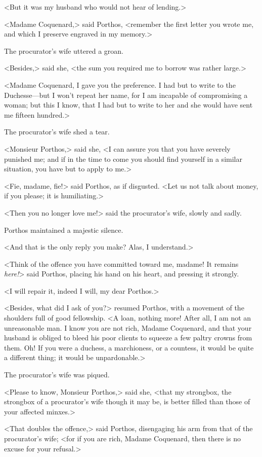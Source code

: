 <But it was my husband who would not hear of lending.> 

<Madame Coquenard,> said Porthos, <remember the first letter you wrote me, and which I preserve engraved in my memory.> 

The procurator's wife uttered a groan. 

<Besides,> said she, <the sum you required me to borrow was rather large.> 

<Madame Coquenard, I gave you the preference. I had but to write to the Duchesse—but I won't repeat her name, for I am incapable of compromising a woman; but this I know, that I had but to write to her and she would have sent me fifteen hundred.> 

The procurator's wife shed a tear. 

<Monsieur Porthos,> said she, <I can assure you that you have severely punished me; and if in the time to come you should find yourself in a similar situation, you have but to apply to me.> 

<Fie, madame, fie!> said Porthos, as if disgusted. <Let us not talk about money, if you please; it is humiliating.> 

<Then you no longer love me!> said the procurator's wife, slowly and sadly. 

Porthos maintained a majestic silence. 

<And that is the only reply you make? Alas, I understand.> 

<Think of the offence you have committed toward me, madame! It remains \emph{here!}> said Porthos, placing his hand on his heart, and pressing it strongly. 

<I will repair it, indeed I will, my dear Porthos.> 

<Besides, what did I ask of you?> resumed Porthos, with a movement of the shoulders full of good fellowship. <A loan, nothing more! After all, I am not an unreasonable man. I know you are not rich, Madame Coquenard, and that your husband is obliged to bleed his poor clients to squeeze a few paltry crowns from them. Oh! If you were a duchess, a marchioness, or a countess, it would be quite a different thing; it would be unpardonable.> 

The procurator's wife was piqued. 

<Please to know, Monsieur Porthos,> said she, <that my strongbox, the strongbox of a procurator's wife though it may be, is better filled than those of your affected minxes.> 

<That doubles the offence,> said Porthos, disengaging his arm from that of the procurator's wife; <for if you are rich, Madame Coquenard, then there is no excuse for your refusal.> 

